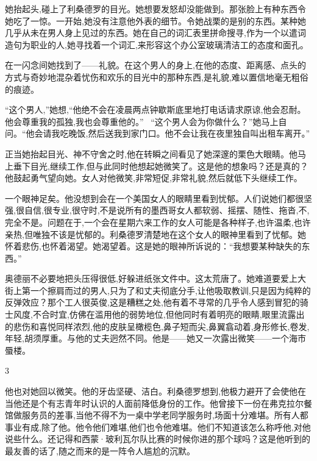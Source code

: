 \documentclass{ctexart}
\renewcommand{\\}{\par}
\begin{document}
\\她抬起头,碰上了利桑德罗的目光。她想要发怒却没能做到。那张脸上有种东西令她吃了一惊。一开始,她没有注意他外表的细节。令她战栗的是别的东西。某种她几乎从未在男人身上见过的东西。她在自己的词汇表里拼命搜寻,作为一个以遣词造句为职业的人,她寻找着一个词汇,来形容这个办公室玻璃清洁工的态度和面孔。\\在一闪念间她找到了——礼貌。在这个男人的身上,在他的态度、距离感、点头的方式与奇妙地混杂着忧伤和欢乐的目光中的那种东西,是礼貌,难以置信地毫无粗俗的痕迹。 \\“这个男人,”她想,“他绝不会在凌晨两点钟歇斯底里地打电话请求原谅,他会忍耐。他会尊重我的孤独,我也会尊重他的。” \ “这个男人会为你做什么？”她马上自问。“他会请我吃晚饭,然后送我到家门口。他不会让我在夜里独自叫出租车离开。” \\正当她抬起目光、神不守舍之时,他在转瞬之间看见了她深邃的栗色大眼睛。他马上垂下目光,继续工作,但与此同时他想起她微笑了。这是他的想象吗？还是真的？他鼓起勇气望向她。女人对他微笑,非常短促,非常礼貌,然后就低下头继续工作。\\一个眼神足矣。他没想到会在一个美国女人的眼睛里看到忧郁。人们说她们都很坚强,很自信,很专业,很守时,不是说所有的墨西哥女人都软弱、摇摆、随性、拖沓,不,完全不是。问题在于,一个会在星期六来工作的女人可能是各种样子,也许温柔,也许亲热,但唯独不该是忧郁的。利桑德罗清楚地在这个女人的眼神里看到了忧郁。她怀着悲伤,也怀着渴望。她渴望着。这是她的眼神所诉说的：“我想要某种缺失的东西。” \\奥德丽不必要地把头压得很低,好躲进纸张文件中。这太荒唐了。她难道要爱上大街上第一个擦肩而过的男人,只为了和丈夫彻底分手,让他吸取教训,只是因为纯粹的反弹效应？那个工人很英俊,这是糟糕之处,他有着不寻常的几乎令人感到冒犯的骑士风度,不合时宜,仿佛在滥用他的弱势地位,但他同时有着明亮的眼睛,眼里流露出的悲伤和喜悦同样浓烈,他的皮肤呈橄榄色,鼻子短而尖,鼻翼翕动着,身形修长,卷发,年轻,胡须厚重。与他的丈夫迥然不同。他是——她又一次露出微笑——一个海市蜃楼。 \\ \begin{center} 3 \end{center} \\他也对她回以微笑。他的牙齿坚硬、洁白。利桑德罗想到,他极力避开了会使他在当他还是个有志青年时认识的人面前降低身份的工作。他曾接下一份在弗克拉尔餐馆做服务员的差事,当他不得不为一桌中学老同学服务时,场面十分难堪。所有人都事业有成,除了他。他令他们难堪,他们也令他难堪。他们不知道该怎么称呼他,对他说些什么。还记得和西蒙·玻利瓦尔队比赛的时候你进的那个球吗？这是他听到的最友善的话了,随之而来的是一阵令人尴尬的沉默。 
\end{document}
